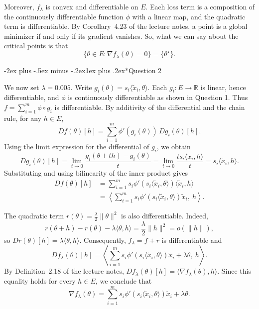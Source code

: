 \documentclass[11pt,a4paper]{article}
\makeatletter
\renewcommand\section{\@startsection{section}{1}{\z@}%
  {-2ex plus -.5ex minus -.2ex}{1ex plus .2ex}{\normalfont\Large\bfseries}}
\makeatother
\begin{document}
Moreover, \(f_\lambda\) is convex and differentiable on \(E\).
Each loss term is a composition of the continuously differentiable
function \(\phi\) with a linear map, and the quadratic term is differentiable. By Corollary~4.23 of the lecture notes, a point is
a global minimizer if and only if its gradient vanishes. So, what we can say about the critical points is that
\[
\{\theta\in E:\nabla f_\lambda(\theta)=0\}=\{\theta^\star\}.
\]

\section*{Question 2}

We now set \(\lambda=0.005\). Write
\(g_i(\theta)=s_i\langle\widetilde{x}_i,\theta\rangle\).
Each \(g_i:E\to\mathbb R\) is linear, hence differentiable, and \(\phi\) is continuously differentiable as shown in Question 1.
Thus \(f=\sum_{i=1}^m\phi\circ g_i\) is differentiable. By additivity of the differential and the chain rule, for any \(h\in E\),
\[
Df(\theta)[h]
=\sum_{i=1}^m \phi'(g_i(\theta))\,Dg_i(\theta)[h].
\]
Using the limit expression for the differential of \(g_i\), we obtain
\[
Dg_i(\theta)[h]
=\lim_{t\to0}\frac{g_i(\theta+th)-g_i(\theta)}{t}
=\lim_{t\to0}\frac{t s_i\langle\widetilde{x}_i,h\rangle}{t}
=s_i\langle\widetilde{x}_i,h\rangle.
\]
Substituting and using bilinearity of the inner product gives
\begin{align*}
Df(\theta)[h]
&=\sum_{i=1}^m
s_i\phi'\!\left(s_i\langle\widetilde{x}_i,\theta\rangle\right)
\langle\widetilde{x}_i,h\rangle\\
&=\left\langle
\sum_{i=1}^m s_i\phi'\!\left(s_i\langle\widetilde{x}_i,\theta\rangle\right)
\widetilde{x}_i,\ h
\right\rangle.
\end{align*}

The quadratic term \(r(\theta)=\frac{\lambda}{2}\|\theta\|^2\) is also differentiable. Indeed,
\[
r(\theta+h)-r(\theta)-\lambda\langle\theta,h\rangle
=\frac{\lambda}{2}\|h\|^2=o(\|h\|),
\]
so \(Dr(\theta)[h]=\lambda\langle\theta,h\rangle\). Consequently, \(f_\lambda=f+r\) is differentiable and
\[
Df_\lambda(\theta)[h]
=\left\langle
\sum_{i=1}^m s_i\phi'\!\left(s_i\langle\widetilde{x}_i,\theta\rangle\right)
\widetilde{x}_i+\lambda\theta,\ h
\right\rangle.
\]
By Definition~2.18 of the lecture notes,
\(Df_\lambda(\theta)[h]=\langle\nabla f_\lambda(\theta),h\rangle\).
Since this equality holds for every \(h\in E\), we conclude that
\[
\boxed{
\nabla f_\lambda(\theta)
=\sum_{i=1}^m
s_i\phi'\!\left(s_i\langle\widetilde{x}_i,\theta\rangle\right)
\widetilde{x}_i+\lambda\theta.
}
\]
\end{document}
